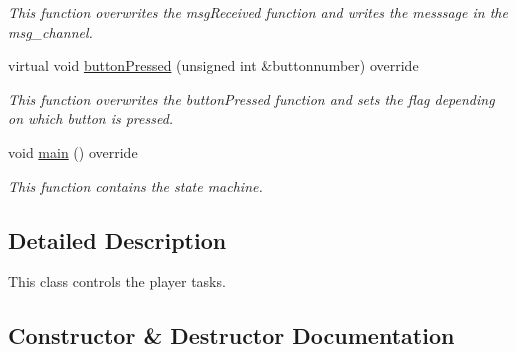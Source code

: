 \begin{DoxyCompactItemize}
\begin{DoxyCompactList}\small\item\em This function overwrites the msg\+Received function and writes the messsage in the msg\+\_\+channel. \end{DoxyCompactList}\item 
\mbox{\label{class_player_control_a513d3c69e50d57af99b0dc14d86aa6c0}} 
virtual void \mbox{\hyperlink{class_player_control_a513d3c69e50d57af99b0dc14d86aa6c0}{button\+Pressed}} (unsigned int \&buttonnumber) override
\begin{DoxyCompactList}\small\item\em This function overwrites the button\+Pressed function and sets the flag depending on which button is pressed. \end{DoxyCompactList}\item 
void \mbox{\hyperlink{class_player_control_a9b3e136e412776977a658b232e7e9d6e}{main}} () override
\begin{DoxyCompactList}\small\item\em This function contains the state machine. \end{DoxyCompactList}\end{DoxyCompactItemize}


\subsection{Detailed Description}
This class controls the player tasks. 

\subsection{Constructor \& Destructor Documentation}
\mbox{\label{class_player_control_af026842ca91afba7f60da162f6fc527e}} 
